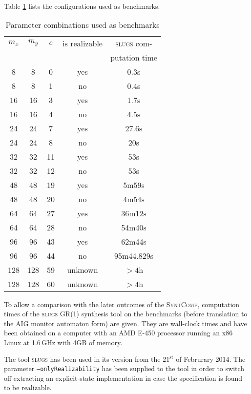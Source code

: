 \documentclass[a4paper,conference,10pt]{IEEEtran}
\newcommand{\SyntComp}{\textsc{SyntComp}}
\begin{document}
\noindent Table \ref{tab:benchmarks} lists the configurations used as benchmarks.
%
\begin{table}[b]
\normalsize
\begin{center}
\begin{tabular}{c|c|c||c|c}
$m_x$ & $m_y$ & $c$ & is realizable & \textsc{slugs} com- \\ & & & & putation time\\ \hline \hline
8 & 8 & 0 & yes & 0.3s \\ \hline
8 & 8 & 1 & no & 0.4s \\ \hline
16 & 16 & 3 & yes & 1.7s \\ \hline
16 & 16 & 4 & no & 4.5s \\ \hline
24 & 24 & 7 & yes & 27.6s\\ \hline
24 & 24 & 8 & no & 20s \\ \hline
32 & 32 & 11 & yes & 53s \\ \hline
32 & 32 & 12 & no & 53s \\ \hline
48 & 48 & 19 & yes & 5m59s \\ \hline
48 & 48 & 20 & no & 4m54s \\ \hline
64 & 64 & 27 & yes & 36m12s   \\ \hline
64 & 64 & 28 & no & 54m40s   \\ \hline
96 & 96 & 43 & yes & 62m44s  \\ \hline
96 & 96 & 44 & no & 95m44.829s  \\ \hline
128 & 128 & 59 & unknown & $> 4$h   \\ \hline
128 & 128 & 60 & unknown & $> 4$h   \\ 

\end{tabular}
\end{center}
\caption{Parameter combinations used as benchmarks}
\label{tab:benchmarks}
\end{table}
%
To allow a comparison with the later outcomes of the \SyntComp{}, computation times of the \textsc{slugs} GR(1) synthesis tool on the benchmarks (before translation to the AIG monitor automaton form) are given. They are wall-clock times and have been obtained on a computer with an AMD E-450 processor running an x86 Linux at 1.6\,GHz with 4GB of memory.

The tool \textsc{slugs} has been used in its version from the 21$^\mathrm{st}$ of Februrary 2014. The parameter \texttt{--onlyRealizability} has been supplied to the tool in order to switch off extracting an explicit-state implementation in case the specification is found to be realizable.



\end{document}
